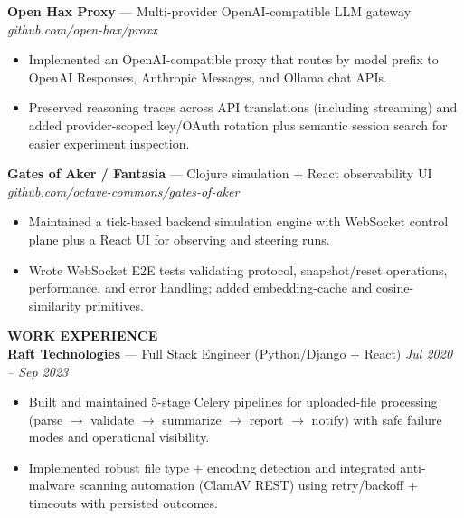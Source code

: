 \documentclass[10pt]{article}
\begin{document}
\textbf{Open Hax Proxy} --- Multi-provider OpenAI-compatible LLM gateway \hfill \textit{github.com/open-hax/proxx}\\
\vspace{-6pt}
\begin{itemize}
  \setlength\itemsep{-2pt}
  \setlength\parskip{0pt}
  \setlength\parsep{0pt}
  \item Implemented an OpenAI-compatible proxy that routes by model prefix to OpenAI Responses, Anthropic Messages, and Ollama chat APIs.
  \item Preserved reasoning traces across API translations (including streaming) and added provider-scoped key/OAuth rotation plus semantic session search for easier experiment inspection.
\end{itemize}

\textbf{Gates of Aker / Fantasia} --- Clojure simulation + React observability UI \hfill \textit{github.com/octave-commons/gates-of-aker}\\
\vspace{-6pt}
\begin{itemize}
  \setlength\itemsep{-2pt}
  \setlength\parskip{0pt}
  \setlength\parsep{0pt}
  \item Maintained a tick-based backend simulation engine with WebSocket control plane plus a React UI for observing and steering runs.
  \item Wrote WebSocket E2E tests validating protocol, snapshot/reset operations, performance, and error handling; added embedding-cache and cosine-similarity primitives.
\end{itemize}

\vspace{4pt}
\textbf{WORK EXPERIENCE}\\

\textbf{Raft Technologies} --- Full Stack Engineer (Python/Django + React) \hfill \textit{Jul 2020 -- Sep 2023}\\
\vspace{-6pt}
\begin{itemize}
  \setlength\itemsep{-2pt}
  \setlength\parskip{0pt}
  \setlength\parsep{0pt}
  \item Built and maintained 5-stage Celery pipelines for uploaded-file processing (parse $\rightarrow$ validate $\rightarrow$ summarize $\rightarrow$ report $\rightarrow$ notify) with safe failure modes and operational visibility.
  \item Implemented robust file type + encoding detection and integrated anti-malware scanning automation (ClamAV REST) using retry/backoff + timeouts with persisted outcomes.
\end{itemize}
\end{document}
